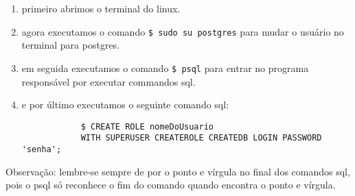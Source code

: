\documentclass[12pt,a4paper]{article}
\begin{document}
\begin{enumerate}
	\item primeiro abrimos o terminal do linux.
	\item agora executamos o comando \verb|$ sudo su postgres| para mudar o usuário no terminal para postgres.
	\item em seguida executamos o comando \verb|$ psql| para entrar no programa responsável por executar commandos sql.
	\item e por último executamos o seguinte comando sql:
		\begin{verbatim}
			$ CREATE ROLE nomeDoUsuario 
			WITH SUPERUSER CREATEROLE CREATEDB LOGIN PASSWORD 'senha';
		\end{verbatim}
\end{enumerate}

Observação: lembre-se sempre de por o ponto e vírgula no final dos comandos sql, pois o psql só reconhece o fim do comando quando encontra o ponto e vírgula.
\end{document}

